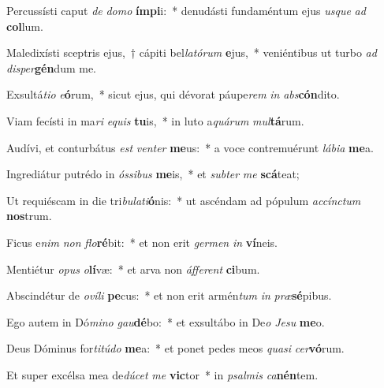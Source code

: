 \item Percussísti caput \textit{de} \textit{do}\textit{mo} \textbf{ím}\textbf{pi}i:~* denudásti fundaméntum ejus \textit{us}\textit{que} \textit{ad} \textbf{col}lum.
\item Maledixísti sceptris ejus,~† cápiti bel\textit{la}\textit{tó}\textit{rum} \textbf{e}jus,~* veniéntibus ut turbo \textit{ad} \textit{di}\textit{sper}\textbf{gén}dum me.
\item Exsultá\textit{ti}\textit{o} \textit{e}\textbf{ó}rum,~* sicut ejus, qui dévorat páupe\textit{rem} \textit{in} \textit{abs}\textbf{cón}dito.
\item Viam fecísti in ma\textit{ri} \textit{e}\textit{quis} \textbf{tu}is,~* in luto a\textit{quá}\textit{rum} \textit{mul}\textbf{tá}rum.
\item Audívi, et conturbátus \textit{est} \textit{ven}\textit{ter} \textbf{me}us:~* a voce contremuérunt \textit{lá}\textit{bi}\textit{a} \textbf{me}a.
\item Ingrediátur putrédo in \textit{ós}\textit{si}\textit{bus} \textbf{me}is,~* et \textit{sub}\textit{ter} \textit{me} \textbf{scá}teat;
\item Ut requiéscam in die tri\textit{bu}\textit{la}\textit{ti}\textbf{ó}nis:~* ut ascéndam ad pópulum \textit{ac}\textit{cínc}\textit{tum} \textbf{nos}trum.
\item Ficus e\textit{nim} \textit{non} \textit{flo}\textbf{ré}bit:~* et non erit \textit{ger}\textit{men} \textit{in} \textbf{ví}neis.
\item Mentiétur \textit{o}\textit{pus} \textit{o}\textbf{lí}væ:~* et arva non \textit{áf}\textit{fe}\textit{rent} \textbf{ci}bum.
\item Abscindétur de \textit{o}\textit{ví}\textit{li} \textbf{pe}cus:~* et non erit armén\textit{tum} \textit{in} \textit{præ}\textbf{sé}pibus.
\item Ego autem in Dó\textit{mi}\textit{no} \textit{gau}\textbf{dé}bo:~* et exsultábo in De\textit{o} \textit{Je}\textit{su} \textbf{me}o.
\item Deus Dóminus for\textit{ti}\textit{tú}\textit{do} \textbf{me}a:~* et ponet pedes meos \textit{qua}\textit{si} \textit{cer}\textbf{vó}rum.
\item Et super excélsa mea de\textit{dú}\textit{cet} \textit{me} \textbf{vic}tor~* in \textit{psal}\textit{mis} \textit{ca}\textbf{nén}tem.
